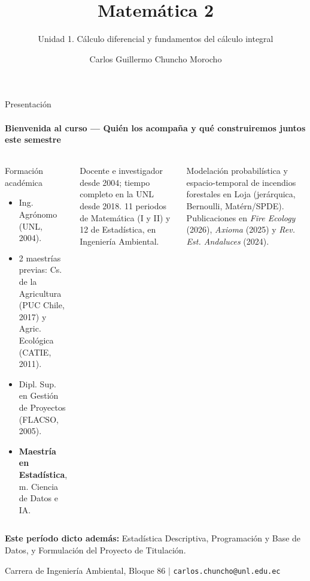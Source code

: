 \documentclass[aspectratio=169,11pt]{beamer}
\title[Unidad 1 -- Matemática 2]{Matemática 2}
\subtitle{Unidad 1. Cálculo diferencial y fundamentos del cálculo integral}
\author[Chuncho Morocho, C. G.]{Carlos Guillermo Chuncho Morocho}
\institute[Ingeniería Ambiental]{Carrera de Ingeniería Ambiental \\ Universidad Nacional de Loja}
\date{}
\begin{document}

\begin{frame}
  \titlepage
\end{frame}

\begin{frame}{Presentación}
\framesubtitle{Bienvenida al curso — Quién los acompaña y qué construiremos juntos este semestre}

\scriptsize
\begin{columns}[T,onlytextwidth]

\begin{block}{Formación académica}
\begin{itemize}[itemsep=0.5pt,topsep=1pt]
  \item Ing. Agrónomo (UNL, 2004).
  \item 2 maestrías previas: Cs. de la Agricultura (PUC Chile, 2017) y Agric. Ecológica (CATIE, 2011).
  \item Dipl. Sup. en Gestión de Proyectos (FLACSO, 2005).
  \item \textbf{Maestría en Estadística}, m. Ciencia de Datos e IA.
\end{itemize}
\end{block}

\begin{envbox}[title=Trayectoria]
Docente e investigador desde 2004; tiempo completo en la UNL desde 2018.
11 periodos de Matemática (I y II) y 12 de Estadística, en Ingeniería Ambiental.
\end{envbox}

\begin{techbox}[title=Investigación actual]
Modelación probabilística y espacio-temporal de incendios forestales en Loja
(jerárquica, Bernoulli, Matérn/SPDE). Publicaciones en \textit{Fire Ecology}
(2026), \textit{Axioma} (2025) y \textit{Rev. Est. Andaluces} (2024).
\end{techbox}

\end{columns}

\vspace{0.04cm}

\begin{keybox}[top=2pt,bottom=2pt]
\textbf{Este período dicto además:} Estadística Descriptiva, Programación y Base de Datos,
y Formulación del Proyecto de Titulación.
\end{keybox}

\vspace{0.03cm}

\centering
\scriptsize
Carrera de Ingeniería Ambiental, Bloque 86
\quad$\vert$\quad
\texttt{carlos.chuncho@unl.edu.ec}

\end{frame}
\end{document}

